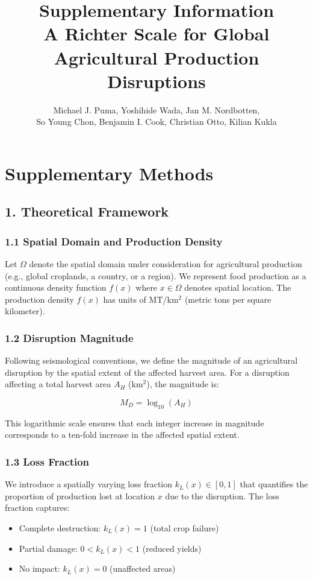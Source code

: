 \documentclass[11pt]{article}
\title{\textbf{Supplementary Information}\\[0.5em]
\large A Richter Scale for Global Agricultural Production Disruptions}
\author{Michael J. Puma, Yoshihide Wada, Jan M. Nordbotten, \\
So Young Chon, Benjamin I. Cook, Christian Otto, Kilian Kukla}
\date{}
\begin{document}
\maketitle

\tableofcontents

\newpage

\section*{Supplementary Methods}

\subsection*{1. Theoretical Framework}

\subsubsection*{1.1 Spatial Domain and Production Density}
Let $\Omega$ denote the spatial domain under consideration for agricultural production (e.g., global croplands, a country, or a region). We represent food production as a continuous density function $f(x)$ where $x \in \Omega$ denotes spatial location. The production density $f(x)$ has units of MT/km$^2$ (metric tons per square kilometer).

\subsubsection*{1.2 Disruption Magnitude}
Following seismological conventions\cite{hanks1979moment}, we define the magnitude of an agricultural disruption by the spatial extent of the affected harvest area. For a disruption affecting a total harvest area $A_H$ (km$^2$), the magnitude is:

\begin{equation}
M_D = \log_{10}(A_H)
\label{eq:magnitude_theory}
\end{equation}

This logarithmic scale ensures that each integer increase in magnitude corresponds to a ten-fold increase in the affected spatial extent.

\subsubsection*{1.3 Loss Fraction}
We introduce a spatially varying loss fraction $k_L(x) \in [0, 1]$ that quantifies the proportion of production lost at location $x$ due to the disruption. The loss fraction captures:
\begin{itemize}
    \item Complete destruction: $k_L(x) = 1$ (total crop failure)
    \item Partial damage: $0 < k_L(x) < 1$ (reduced yields)
    \item No impact: $k_L(x) = 0$ (unaffected areas)
\end{itemize}
\end{document}
